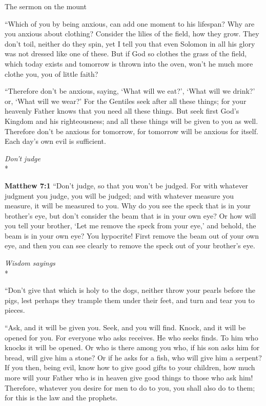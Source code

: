 \documentclass[10pt,twoside]{article} %
\newcommand{\quotesize}{\normalsize{}}
\newenvironment{quotetext}{\begingroup\quotesize}{\endgroup}
\newcommand{\intex}[1]{\index[texts]{#1}}
\newcommand{\bible}[2]{\begin{quotetext}\textbf{#1}\intex{#1} #2\end{quotetext}}
\newcommand{\matthew}[2]{\bible{Matthew #1}{#2}}
\newcommand{\subhead}[1]{\emph{#1}\\*}
\begin{document}
\begin{section}{The sermon on the mount}
{   ``Which of you by being anxious, can add one moment to his lifespan?    Why are you anxious about clothing? Consider the lilies of the field, how they grow. They don't toil, neither do they spin,    yet I tell you that even Solomon in all his glory was not dressed like one of these.    But if God so clothes the grass of the field, which today exists and tomorrow is thrown into the oven, won't he much more clothe you, you of little faith?

   ``Therefore don't be anxious, saying, `What will we eat?', `What will we drink?' or, `What will we wear?'    For the Gentiles seek after all these things; for your heavenly Father knows that you need all these things.    But seek first God's Kingdom and his righteousness; and all these things will be given to you as well.    Therefore don't be anxious for tomorrow, for tomorrow will be anxious for itself. Each day's own evil is sufficient. 
}

\subhead{Don't judge}

\matthew{7:1}{
    ``Don't judge, so that you won't be judged.    For with whatever judgment you judge, you will be judged; and with whatever measure you measure, it will be measured to you.    Why do you see the speck that is in your brother's eye, but don't consider the beam that is in your own eye?    Or how will you tell your brother, `Let me remove the speck from your eye,' and behold, the beam is in your own eye?    You hypocrite! First remove the beam out of your own eye, and then you can see clearly to remove the speck out of your brother's eye.

\subhead{Wisdom sayings}

   ``Don't give that which is holy to the dogs, neither throw your pearls before the pigs, lest perhaps they trample them under their feet, and turn and tear you to pieces.

   ``Ask, and it will be given you. Seek, and you will find. Knock, and it will be opened for you.    For everyone who asks receives. He who seeks finds. To him who knocks it will be opened.    Or who is there among you who, if his son asks him for bread, will give him a stone?    Or if he asks for a fish, who will give him a serpent?    If you then, being evil, know how to give good gifts to your children, how much more will your Father who is in heaven give good things to those who ask him!    Therefore, whatever you desire for men to do to you, you shall also do to them; for this is the law and the prophets.

}
\end{section}
\end{document}
